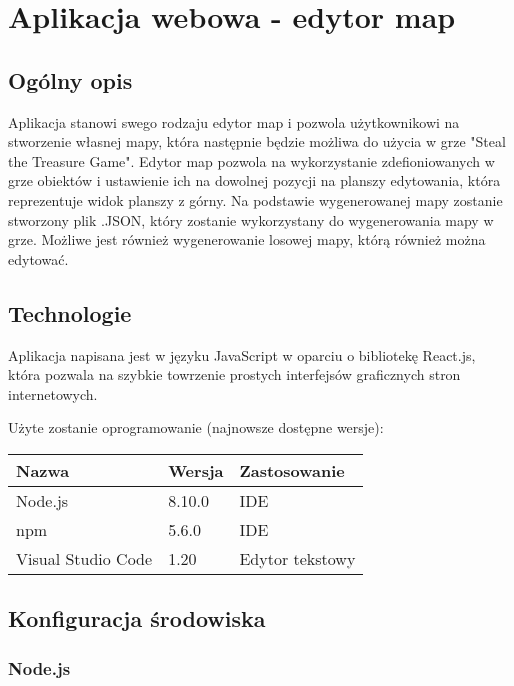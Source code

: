 \documentclass{article}
\begin{document}
\section{Aplikacja webowa - edytor map}
\subsection{Ogólny opis}
\par Aplikacja stanowi swego rodzaju edytor map i pozwola użytkownikowi na stworzenie własnej mapy, która następnie będzie możliwa do użycia w grze "Steal the Treasure Game". Edytor map pozwola na wykorzystanie zdefioniowanych w grze obiektów i ustawienie ich na dowolnej pozycji na planszy edytowania, która reprezentuje widok planszy z górny. Na podstawie wygenerowanej mapy zostanie stworzony plik .JSON, który zostanie wykorzystany do wygenerowania mapy w grze. Możliwe jest również wygenerowanie losowej mapy, którą również można edytować.

\subsection{Technologie }
\par Aplikacja napisana jest w języku JavaScript w oparciu o bibliotekę React.js, która pozwala na szybkie towrzenie prostych interfejsów graficznych stron internetowych.

\par Użyte zostanie oprogramowanie (najnowsze dostępne wersje):
\begin{table}[H]
	\centering
	\begin{tabular}{|l|l|l|}
		\hline
		Nazwa              & Wersja & Zastosowanie    \\ \hline
		Node.js	           & 8.10.0 & IDE     		  \\ \hline
		npm	   	           & 5.6.0  & IDE             \\ \hline
		Visual Studio Code & 1.20   & Edytor tekstowy \\ \hline
	\end{tabular}
\end{table}

\subsection{Konfiguracja środowiska}
\subsubsection{Node.js}
\end{document}
